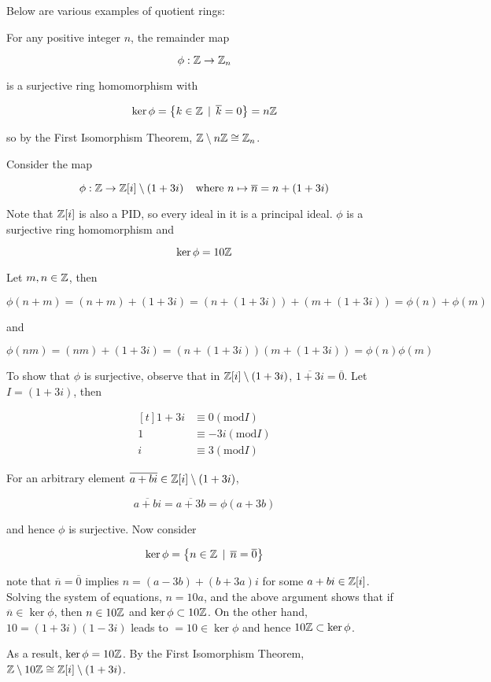 \documentclass[a4paper,12pt]{article}
\begin{document}
\begin{exm}
  Below are various examples of quotient rings:

  \begin{alist}
    \item For any positive integer $n$, the remainder map

    $$\phi:\mathbb{Z}\to\mathbb{Z}_{n}$$\s

    is a surjective ring homomorphism with

    $$\ker\phi=\left\{ k\in\mathbb{Z}\,\mid\,\overline{k}=0\right\}=n\mathbb{Z}$$\s

    so by the First Isomorphism Theorem, $\mathbb{Z}\setminus n\mathbb{Z}\cong\mathbb{Z}_{n}$.

    \item Consider the map

    $$\phi:\mathbb{Z}\to\mathbb{Z}[i]\setminus(1+3i)\;\;\;\;\text{where }n\mapsto\overline{n}=n+(1+3i)$$\s

    Note that $\mathbb{Z}[i]$ is also a PID, so every ideal in it is a principal ideal. $\phi$ is a surjective ring homomorphism and

    $$\ker\phi=10\mathbb{Z}$$\s

    \prf[zb] Let $m,n\in\mathbb{Z}$, then

    $$\phi(n+m)=(n+m)+(1+3i)=(n+(1+3i))+(m+(1+3i))=\phi(n)+\phi(m)$$\s

    and

    $$\phi(nm)=(nm)+(1+3i)=(n+(1+3i))(m+(1+3i))=\phi(n)\phi(m)$$\s

    To show that $\phi$ is surjective, observe that in $\mathbb{Z}[i]\setminus(1+3i)$, $\overline{1+3i}=\overline{0}$. Let $I=(1+3i)$, then

    $$\begin{aligned}[t]
      1+3i&\equiv 0(\mathrm{mod} I)\\
      1&\equiv-3i(\mathrm{mod} I)\\
      i&\equiv 3(\mathrm{mod} I)
    \end{aligned}$$\s

    For an arbitrary element $\overline{a+bi}\in\mathbb{Z}[i]\setminus(1+3i)$,

    $$\overline{a+bi}=\overline{a+3b}=\phi(a+3b)$$\s

    and hence $\phi$ is surjective. Now consider

    $$\ker\phi=\left\{ n\in\mathbb{Z}\,\mid\,\overline{n}=\overline{0}\right\}$$\s

    note that $\overline{n}=\overline{0}$ implies $n=(a-3b)+(b+3a)i$ for some $a+bi\in\mathbb{Z}[i]$. Solving the system of equations, $n=10a$, and the above argument shows that if $\overline{n}\in\ker\phi$, then $n\in 10\mathbb{Z}$ and $\ker\phi\subset 10\mathbb{Z}$. On the other hand, $10=(1+3i)(1-3i)$ leads to $=10\in\ker\phi$ and hence $10\mathbb{Z}\subset\ker\phi$.\n

    As a result, $\ker\phi=10\mathbb{Z}$. By the First Isomorphism Theorem, $\mathbb{Z}\setminus 10\mathbb{Z}\cong\mathbb{Z}[i]\setminus(1+3i)$.
  \end{alist}
\end{exm}
\end{document}
